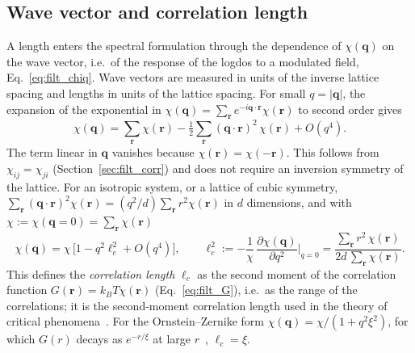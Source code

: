 \documentclass[10pt,a4paper]{article}
\theoremstyle{plain}
\newcommand{\lndos}{{logdos}}  %
\begin{document}
\subsection{Wave vector and correlation length}
\label{sec:filt_length}\label{sec:filt_corrq}

A length enters the spectral formulation through the dependence of
$\chi(\mathbf q)$ on the wave vector, i.e.\ of the response of the \lndos{}
to a modulated field, Eq.~\eqref{eq:filt_chiq}. Wave vectors are measured in
units of the inverse lattice spacing and lengths in units of the lattice
spacing. For small $q=|\mathbf q|$, the expansion of the exponential in
$\chi(\mathbf q)=\sum_{\mathbf r}e^{-i\mathbf q\cdot\mathbf r}\chi(\mathbf r)$
to second order gives
\[
  \chi(\mathbf q)=\sum_{\mathbf r}\chi(\mathbf r)
  -\tfrac12\sum_{\mathbf r}(\mathbf q\cdot\mathbf r)^{2}\,\chi(\mathbf r)+O(q^{4}) .
\]
The term linear in $\mathbf q$ vanishes because
$\chi(\mathbf r)=\chi(-\mathbf r)$. This follows from $\chi_{ij}=\chi_{ji}$
(Section~\ref{sec:filt_corr}) and does not require an inversion symmetry of
the lattice. For an isotropic system, or a lattice of cubic symmetry,
$\sum_{\mathbf r}(\mathbf q\cdot\mathbf r)^{2}\chi(\mathbf r)
=(q^{2}/d)\sum_{\mathbf r}r^{2}\chi(\mathbf r)$ in $d$ dimensions, and with
$\chi:=\chi(\mathbf q=0)=\sum_{\mathbf r}\chi(\mathbf r)$
\begin{equation}\label{eq:filt_elldef}
  \chi(\mathbf q)=\chi\,\big[1-q^{2}\ell_c^{2}+O(q^{4})\big] ,
  \qquad
  \ell_c^{2}:=-\frac{1}{\chi}\,\frac{\partial\chi(\mathbf q)}{\partial q^{2}}\bigg|_{q=0}
  =\frac{\sum_{\mathbf r}r^{2}\,\chi(\mathbf r)}{2d\,\sum_{\mathbf r}\chi(\mathbf r)} .
\end{equation}
This defines the \emph{correlation length} $\ell_c$ as the second moment of
the correlation function $G(\mathbf r)=k_BT\chi(\mathbf r)$
(Eq.~\eqref{eq:filt_G}), i.e.\ as the range of the correlations; it is the
second-moment correlation length used in the theory of critical
phenomena~\cite{PelissettoVicari2002}. For the Ornstein--Zernike form
$\chi(\mathbf q)=\chi/(1+q^{2}\xi^{2})$, for which $G(r)$ decays as
$e^{-r/\xi}$ at large $r$~\cite[Sec.~6.5.4]{Schwabl}, $\ell_c=\xi$.
\end{document}
